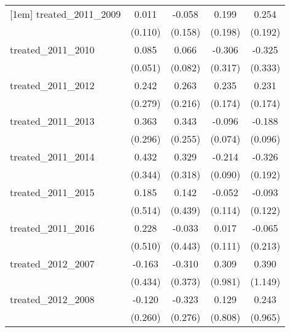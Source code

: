 {\begin{tabular}{l*{4}{c}}
[1em]
treated\_2011\_2009&       0.011         &      -0.058         &       0.199         &       0.254         \\
            &     (0.110)         &     (0.158)         &     (0.198)         &     (0.192)         \\
[1em]
treated\_2011\_2010&       0.085         &       0.066         &      -0.306         &      -0.325         \\
            &     (0.051)         &     (0.082)         &     (0.317)         &     (0.333)         \\
[1em]
treated\_2011\_2012&       0.242         &       0.263         &       0.235         &       0.231         \\
            &     (0.279)         &     (0.216)         &     (0.174)         &     (0.174)         \\
[1em]
treated\_2011\_2013&       0.363         &       0.343         &      -0.096         &      -0.188         \\
            &     (0.296)         &     (0.255)         &     (0.074)         &     (0.096)         \\
[1em]
treated\_2011\_2014&       0.432         &       0.329         &      -0.214\sym{*}  &      -0.326         \\
            &     (0.344)         &     (0.318)         &     (0.090)         &     (0.192)         \\
[1em]
treated\_2011\_2015&       0.185         &       0.142         &      -0.052         &      -0.093         \\
            &     (0.514)         &     (0.439)         &     (0.114)         &     (0.122)         \\
[1em]
treated\_2011\_2016&       0.228         &      -0.033         &       0.017         &      -0.065         \\
            &     (0.510)         &     (0.443)         &     (0.111)         &     (0.213)         \\
[1em]
treated\_2012\_2007&      -0.163         &      -0.310         &       0.309         &       0.390         \\
            &     (0.434)         &     (0.373)         &     (0.981)         &     (1.149)         \\
[1em]
treated\_2012\_2008&      -0.120         &      -0.323         &       0.129         &       0.243         \\
            &     (0.260)         &     (0.276)         &     (0.808)         &     (0.965)         \\

\end{tabular}}

